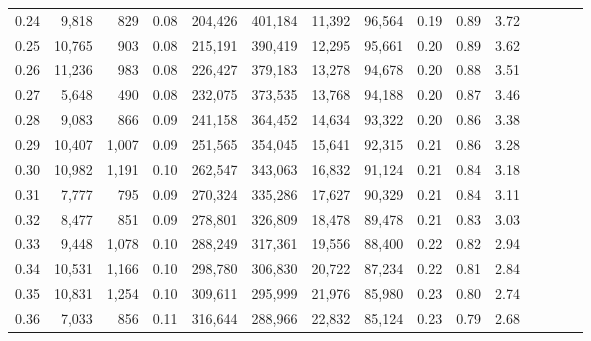 \begin{tabular}{rrrcrrrrrrrrrrr}
0.24 &   9,818 &    829 &                                       0.08 &  204,426 &  401,184 &   11,392 &   96,564 &  0.19 &  0.89 &                         3.72 \\
0.25 &  10,765 &    903 &                                       0.08 &  215,191 &  390,419 &   12,295 &   95,661 &  0.20 &  0.89 &                         3.62 \\
0.26 &  11,236 &    983 &                                       0.08 &  226,427 &  379,183 &   13,278 &   94,678 &  0.20 &  0.88 &                         3.51 \\
0.27 &   5,648 &    490 &                                       0.08 &  232,075 &  373,535 &   13,768 &   94,188 &  0.20 &  0.87 &                         3.46 \\
0.28 &   9,083 &    866 &                                       0.09 &  241,158 &  364,452 &   14,634 &   93,322 &  0.20 &  0.86 &                         3.38 \\
0.29 &  10,407 &  1,007 &                                       0.09 &  251,565 &  354,045 &   15,641 &   92,315 &  0.21 &  0.86 &                         3.28 \\
0.30 &  10,982 &  1,191 &                                       0.10 &  262,547 &  343,063 &   16,832 &   91,124 &  0.21 &  0.84 &                         3.18 \\
0.31 &   7,777 &    795 &                                       0.09 &  270,324 &  335,286 &   17,627 &   90,329 &  0.21 &  0.84 &                         3.11 \\
0.32 &   8,477 &    851 &                                       0.09 &  278,801 &  326,809 &   18,478 &   89,478 &  0.21 &  0.83 &                         3.03 \\
0.33 &   9,448 &  1,078 &                                       0.10 &  288,249 &  317,361 &   19,556 &   88,400 &  0.22 &  0.82 &                         2.94 \\
0.34 &  10,531 &  1,166 &                                       0.10 &  298,780 &  306,830 &   20,722 &   87,234 &  0.22 &  0.81 &                         2.84 \\
0.35 &  10,831 &  1,254 &                                       0.10 &  309,611 &  295,999 &   21,976 &   85,980 &  0.23 &  0.80 &                         2.74 \\
0.36 &   7,033 &    856 &                                       0.11 &  316,644 &  288,966 &   22,832 &   85,124 &  0.23 &  0.79 &                         2.68 \\

\end{tabular}
